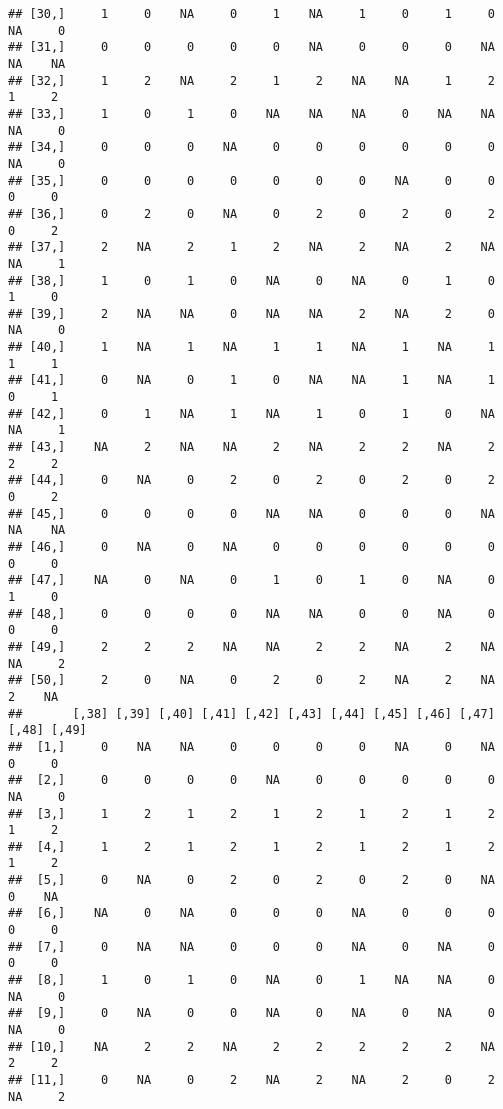 \documentclass[
]{article}
\begin{document}
\begin{verbatim}
## [30,]     1     0    NA     0     1    NA     1     0     1     0    NA     0
## [31,]     0     0     0     0     0    NA     0     0     0    NA    NA    NA
## [32,]     1     2    NA     2     1     2    NA    NA     1     2     1     2
## [33,]     1     0     1     0    NA    NA    NA     0    NA    NA    NA     0
## [34,]     0     0     0    NA     0     0     0     0     0     0    NA     0
## [35,]     0     0     0     0     0     0     0    NA     0     0     0     0
## [36,]     0     2     0    NA     0     2     0     2     0     2     0     2
## [37,]     2    NA     2     1     2    NA     2    NA     2    NA    NA     1
## [38,]     1     0     1     0    NA     0    NA     0     1     0     1     0
## [39,]     2    NA    NA     0    NA    NA     2    NA     2     0    NA     0
## [40,]     1    NA     1    NA     1     1    NA     1    NA     1     1     1
## [41,]     0    NA     0     1     0    NA    NA     1    NA     1     0     1
## [42,]     0     1    NA     1    NA     1     0     1     0    NA    NA     1
## [43,]    NA     2    NA    NA     2    NA     2     2    NA     2     2     2
## [44,]     0    NA     0     2     0     2     0     2     0     2     0     2
## [45,]     0     0     0     0    NA    NA     0     0     0    NA    NA    NA
## [46,]     0    NA     0    NA     0     0     0     0     0     0     0     0
## [47,]    NA     0    NA     0     1     0     1     0    NA     0     1     0
## [48,]     0     0     0     0    NA    NA     0     0    NA     0     0     0
## [49,]     2     2     2    NA    NA     2     2    NA     2    NA    NA     2
## [50,]     2     0    NA     0     2     0     2    NA     2    NA     2    NA
##       [,38] [,39] [,40] [,41] [,42] [,43] [,44] [,45] [,46] [,47] [,48] [,49]
##  [1,]     0    NA    NA     0     0     0     0    NA     0    NA     0     0
##  [2,]     0     0     0     0    NA     0     0     0     0     0    NA     0
##  [3,]     1     2     1     2     1     2     1     2     1     2     1     2
##  [4,]     1     2     1     2     1     2     1     2     1     2     1     2
##  [5,]     0    NA     0     2     0     2     0     2     0    NA     0    NA
##  [6,]    NA     0    NA     0     0     0    NA     0     0     0     0     0
##  [7,]     0    NA    NA     0     0     0    NA     0    NA     0     0     0
##  [8,]     1     0     1     0    NA     0     1    NA    NA     0    NA     0
##  [9,]     0    NA     0     0    NA     0    NA     0    NA     0    NA     0
## [10,]    NA     2     2    NA     2     2     2     2     2    NA     2     2
## [11,]     0    NA     0     2    NA     2    NA     2     0     2    NA     2

\end{verbatim}
\end{document}

